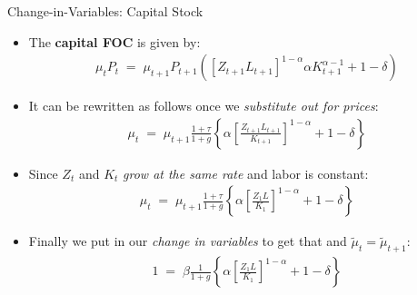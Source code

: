 \documentclass[10pt,c,aspectratio=1610,handout]{beamer}
\begin{document}
\begin{frame}{Change-in-Variables: Capital Stock}%
  \begin{itemize}%
    \item[$\blacktriangleright$] The \textbf{capital FOC} is given by:%
    \begin{align*}%
      \mu _{t} P_{t} \; = \; \mu _{t+1} P_{t+1} \left( \left[ Z_{t+1}L_{t+1} \right]^{1-\alpha} \alpha K_{t+1}^{\alpha-1} + 1 - \delta \right)%
    \end{align*}%
    \pause%
    \item[$\blacktriangleright$] It can be rewritten as follows once we \emph{substitute out for prices}:%
    \begin{align*}%
      \mu_{t} \; = \; \mu_{t+1} \frac{1+\tau}{1+g} \left\{ \alpha \left[ \frac{Z_{t+1}L_{t+1}}{K_{t+1}} \right]^{1-\alpha} + 1 - \delta \right\}%
    \end{align*}%
    \pause%
    \item[$\blacktriangleright$] Since $Z_{t}$ and $K_{t}$ \emph{grow at the same rate} and labor is constant:%
    \begin{align*}%
      \mu_{t} \; = \; \mu_{t+1} \frac{1+\tau}{1+g} \left\{ \alpha \left[ \frac{Z_{1}L}{K_{1}} \right]^{1-\alpha} + 1 - \delta \right\}%
    \end{align*}%
    \pause%
    \item[$\blacktriangleright$] Finally we put in our \emph{change in variables} to get that and $\tilde \mu_t = \tilde \mu_{t+1}$:%
    \begin{align*}%
      1 \; = \; \beta \frac{1}{1+g} \left\{ \alpha \left[ \frac{Z_{1}L}{K_{1}} \right]^{1-\alpha} + 1 - \delta \right\}%
    \end{align*}%
  \end{itemize}%
\end{frame}%
\end{document}
